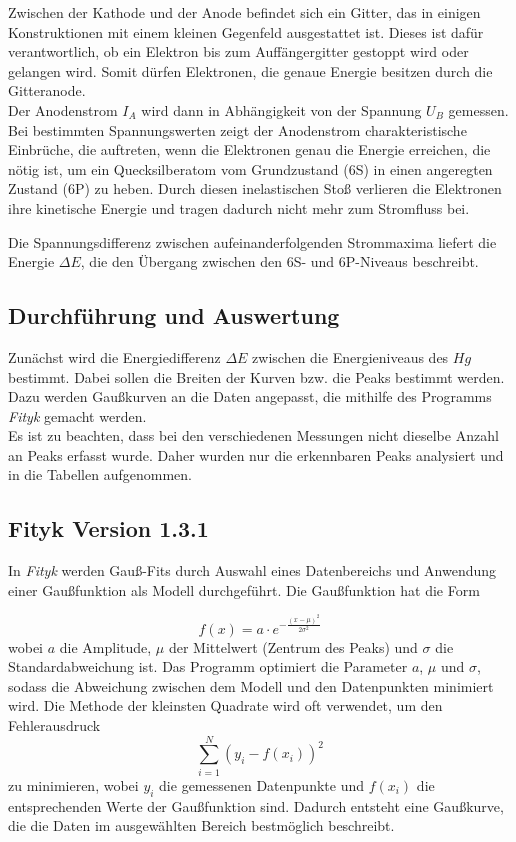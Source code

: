 \documentclass{article}
\begin{document}
\begin{multicols}{2}
Zwischen der Kathode und der Anode befindet sich ein Gitter, das in einigen Konstruktionen mit einem kleinen 
Gegenfeld ausgestattet ist. Dieses ist dafür verantwortlich, ob ein Elektron bis zum Auffängergitter 
gestoppt wird oder gelangen wird. Somit dürfen Elektronen, die genaue Energie besitzen
durch die Gitteranode. 
\\Der Anodenstrom $I_A$
wird dann in Abhängigkeit von der Spannung $U_B$ gemessen. Bei bestimmten Spannungswerten zeigt 
der Anodenstrom charakteristische Einbrüche, die auftreten, wenn die Elektronen genau die Energie 
erreichen, die nötig ist, um ein Quecksilberatom vom Grundzustand (6S) in einen angeregten 
Zustand (6P) zu heben.
 Durch diesen inelastischen Stoß verlieren die Elektronen ihre kinetische Energie und tragen dadurch nicht mehr zum Stromfluss bei.

Die Spannungsdifferenz zwischen aufeinanderfolgenden Strommaxima liefert die Energie $\Delta E$, die den 
Übergang zwischen den 6S- und 6P-Niveaus beschreibt. 
\subsection{Durchführung und Auswertung}
Zunächst wird die Energiedifferenz $\Delta E$ zwischen die Energieniveaus des $Hg$ bestimmt. 
Dabei sollen die Breiten der Kurven bzw. die Peaks bestimmt werden. Dazu werden Gaußkurven an die Daten angepasst,
die mithilfe des Programms \textit{Fityk} gemacht werden.
\\ Es ist zu beachten, dass bei den verschiedenen Messungen nicht dieselbe Anzahl an Peaks 
erfasst wurde. Daher wurden nur die erkennbaren Peaks analysiert und in die Tabellen 
aufgenommen. 
\subsection*{Fityk Version 1.3.1}
In \textit{Fityk} werden Gauß-Fits durch Auswahl eines Datenbereichs und Anwendung einer Gaußfunktion als 
Modell durchgeführt. Die Gaußfunktion hat die Form 

\begin{equation*}
f(x) = a \cdot e^{-\frac{(x - \mu)^2}{2 \sigma^2}}
\end{equation*}
wobei $a$ die Amplitude, $\mu$ der Mittelwert (Zentrum des Peaks) und $\sigma$ die Standardabweichung 
ist. Das Programm optimiert die Parameter $a$, $\mu$ und $\sigma$, sodass die Abweichung zwischen dem Modell 
und den Datenpunkten minimiert wird. Die Methode der kleinsten Quadrate wird oft verwendet, um den
 Fehlerausdruck
\begin{equation*}
\sum_{i=1}^{N} (y_i - f(x_i))^2
\end{equation*}
zu minimieren, wobei $y_i$ die gemessenen Datenpunkte und $f(x_i)$ die entsprechenden Werte der Gaußfunktion 
sind. Dadurch entsteht eine Gaußkurve, die die Daten im ausgewählten Bereich bestmöglich beschreibt.

\end{multicols}
\end{document}
